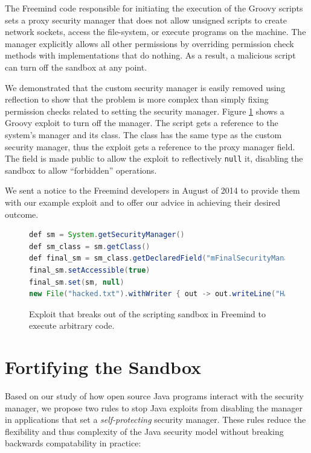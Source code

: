 \documentclass{sig-alternate}
\begin{document}
The Freemind code responsible for initiating the execution of the
Groovy scripts sets a proxy security manager that does not allow unsigned
scripts to create network sockets, access the file-system, or execute
programs on the machine. The manager explicitly allows all other permissions by overriding permission check methods with implementations that do nothing. As a result, a malicious script can turn off the sandbox at any point.

We demonstrated that the custom security manager is easily removed
using reflection to show that the problem is more complex than simply
fixing permission checks related to setting the security manager. Figure \ref{fig:Example-Exploit-for-Freemind}
shows a Groovy exploit to turn off the manager. The script gets a reference to the system's manager
and its class. The class has the same type as the custom security
manager, thus the exploit gets a reference to the proxy manager field.
The field is made public to allow the exploit to reflectively \texttt{null}
it, disabling the sandbox to allow ``forbidden'' operations.

We sent a notice to the Freemind developers in August of 2014 to provide
them with our example exploit and to offer our advice in achieving
their desired outcome. 

\begin{figure}
\begin{lstlisting}[language=Java,basicstyle={\scriptsize},breaklines=true]
def sm = System.getSecurityManager() 
def sm_class = sm.getClass() 
def final_sm = sm_class.getDeclaredField("mFinalSecurityManager")
final_sm.setAccessible(true) 
final_sm.set(sm, null)
new File("hacked.txt").withWriter { out -> out.writeLine("HACKED!") }
\end{lstlisting}
\caption{Exploit that breaks out of the scripting sandbox in Freemind\label{fig:Example-Exploit-for-Freemind}
to execute arbitrary code.}
\end{figure}


\section{Fortifying the Sandbox}\label{sec:Rules-for-Fortifying}

Based on our study of how open source Java programs interact with the security
manager, we propose two rules to stop Java exploits
from disabling the manager in applications that set a \emph{self-protecting}
security manager.  These rules reduce the flexibility and thus complexity of the
Java security model without breaking backwards compatability in practice:
\end{document}

